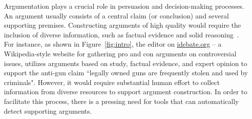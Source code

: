 



Argumentation plays a crucial role in persuasion and decision-making processes. An argument usually consists of a central claim (or conclusion) and several supporting premises. Constructing arguments of high quality would require the inclusion of diverse information, such as factual evidence and solid reasoning~\cite{rieke1997argumentation,park2014identifying}. 
%
For instance, as shown in Figure~\ref{fig:intro}, the editor on \url{idebate.org} -- a Wikipedia-style website for gathering pro and con arguments on controversial issues, utilizes arguments based on study, factual evidence, and expert opinion to support the anti-gun claim ``legally owned guns are frequently stolen and used by criminals". 
%
However, it would require substantial human effort to collect information from diverse resources to support argument construction. In order to facilitate this process, there is a pressing need for tools that can automatically detect supporting arguments. 


